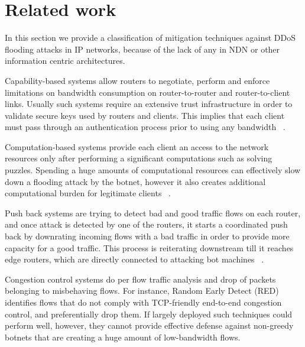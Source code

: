 \section{Related work}
\label{sec:related work}

In this section we provide a classification of mitigation techniques against DDoS flooding attacks in IP networks, because of the lack of any in NDN or other information centric architectures. 


Capability-based systems allow routers to negotiate, perform and enforce limitations on bandwidth consumption on router-to-router and router-to-client links. Usually such systems require an extensive trust infrastructure in order to validate secure keys used by routers and clients. This implies that each client must pass through an authentication process prior to using any bandwidth ~\cite{Capabilities}.   

Computation-based systems provide each client an access to the network resources only after performing a significant computations such as solving puzzles. Spending a huge amounts of computational resources can effectively slow down a flooding attack by the botnet, however it also creates additional computational burden for legitimate clients ~\cite{Portcullis}.

Push back systems are trying to detect bad and good traffic flows on each router, and once attack is detected by one of the routers, it starts a coordinated push back by downrating incoming flows with a bad traffic in order to provide more capacity for a good traffic. This process is reiterating downstream till it reaches edge routers, which are directly connected to attacking bot machines ~\cite{Pushback}. 

Congestion control systems do per flow traffic analysis and drop of packets belonging to misbehaving flows. For instance, Random Early Detect (RED)~\cite{RED} identifies flows that do not comply with TCP-friendly end-to-end congestion control, and preferentially drop them. If largely deployed such techniques could perform well, however, they cannot provide effective defense against non-greedy botnets that are creating a huge amount of low-bandwidth flows. 


